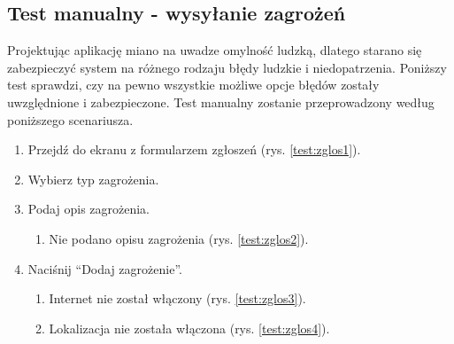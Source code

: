 \subsection*{Test manualny - wysyłanie zagrożeń}
Projektując aplikację miano na uwadze omylność ludzką, dlatego starano się zabezpieczyć system na różnego rodzaju błędy ludzkie i niedopatrzenia. Poniższy test sprawdzi, czy na pewno wszystkie możliwe opcje błędów zostały uwzględnione i zabezpieczone. Test manualny zostanie przeprowadzony według poniższego scenariusza.
\begin{enumerate}
    \item Przejdź do ekranu z formularzem zgłoszeń (rys. \ref{test:zglos1}).
    \item Wybierz typ zagrożenia.
    \item Podaj opis zagrożenia.
    \begin{enumerate}
        \item Nie podano opisu zagrożenia (rys. \ref{test:zglos2}).
    \end{enumerate}
    \item Naciśnij “Dodaj zagrożenie”.
    \begin{enumerate}
        \item Internet nie został włączony (rys. \ref{test:zglos3}).
        \item Lokalizacja nie została włączona (rys. \ref{test:zglos4}).
    \end{enumerate}
\end{enumerate}

